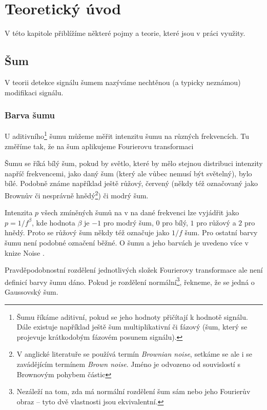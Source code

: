\chapter{Teoretický úvod}

V této kapitole přiblížíme některé pojmy a teorie, které jsou v práci využity.

\section{Šum}

V teorii detekce signálu šumem nazýváme nechtěnou (a typicky neznámou) modifikaci signálu.

\subsection{Barva šumu}

U aditivního\footnote{Šumu říkáme aditivní, pokud se jeho hodnoty přičítají k
hodnotě signálu. Dále existuje například ještě šum multiplikativní či fázový
(šum, který se projevuje krátkodobým fázovém posunem signálu).} šumu můžeme
měřit intenzitu šumu na různých frekvencích. Tu změříme tak, že na šum aplikujeme
Fourierovu transformaci

 Šumu se
říká bílý šum, pokud by světlo, které by mělo stejnou distribuci intenzity
napříč frekvencemi, jako daný šum (který ale vůbec nemusí být světelný), bylo
bílé. Podobně známe například ještě růžový, červený (někdy též označovaný jako
Brownův či nesprávně hnědý\footnote{V anglické literatuře se používá
termín {\it Brownian noise}, setkáme se ale i se zavádějícím
termínem {\it Brown noise}. Jméno je odvozeno od souvislostí s Brownovým pohybem částic}) či modrý šum.

Intenzita $p$ všech zmíněných šumů na v na dané frekvenci lze vyjádřit jako
$p=1/f^\beta$, kde hodnota $\beta$ je $-1$ pro modrý šum, $0$ pro bílý, $1$ pro
růžový a $2$ pro hnědý. Proto se růžový šum někdy též označuje jako $1/f$ šum. Pro
ostatní barvy šumu není podobné označení běžné. O šumu a jeho barvách je uvedeno více v
knize Noise \citep{Noise}.

Pravděpodobnostní rozdělení jednotlivých složek Fourierovy transformace ale
není definicí barvy šumu dáno. Pokud je rozdělení normální\footnote{Nezáleží na
tom, zda má normální rozdělení šum sám nebo jeho Fourierův obraz -- tyto dvě
vlastnosti jsou ekvivalentní.}, řekneme, že se jedná o Gaussovský šum.

